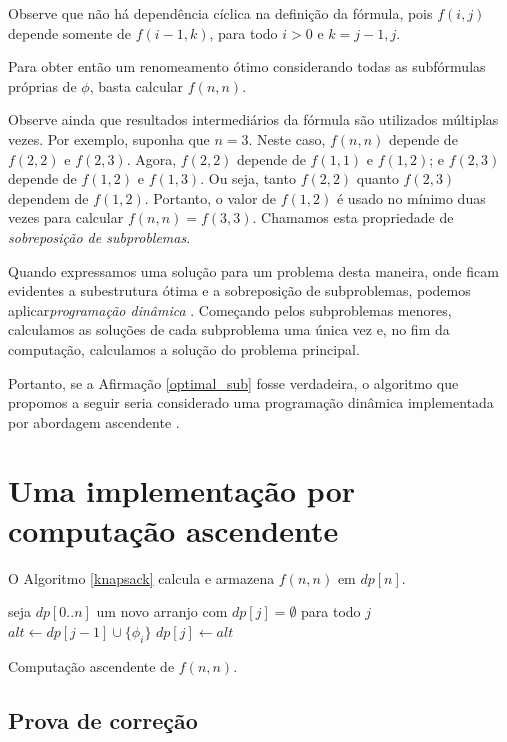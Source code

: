 Observe que não há dependência cíclica na definição da fórmula, pois $f(i,j)$ depende somente de $f(i-1,k)$, para todo $i > 0$ e $k=j-1,j$.

Para obter então um renomeamento ótimo considerando todas as subfórmulas próprias de $\phi$, basta calcular $f(n,n)$.

Observe ainda que resultados intermediários da fórmula são utilizados múltiplas vezes. Por exemplo, suponha que $n = 3$. Neste caso, $f(n,n)$ depende de $f(2,2)$ e $f(2,3)$. Agora, $f(2,2)$ depende de $f(1,1)$ e $f(1,2)$; e $f(2,3)$ depende de $f(1,2)$ e $f(1,3)$. Ou seja, tanto $f(2,2)$ quanto $f(2,3)$ dependem de $f(1,2)$. Portanto, o valor de $f(1,2)$ é usado no mínimo duas vezes para calcular $f(n,n) = f(3,3)$. Chamamos esta propriedade de \emph{sobreposição de subproblemas}.

Quando expressamos uma solução para um problema desta maneira, onde ficam evidentes a subestrutura ótima e a sobreposição de subproblemas, podemos aplicar\break \emph{programação dinâmica} \cite{bellman2015applied}. Começando pelos subproblemas menores, calculamos as soluções de cada subproblema uma única vez e, no fim da computação, calculamos a solução do problema principal.

Portanto, se a Afirmação \ref{optimal_sub} fosse verdadeira, o algoritmo que propomos a seguir seria considerado uma programação dinâmica implementada por abordagem ascendente \cite{bellman2015applied}.

\section{Uma implementação por computação ascendente}

\indent

O Algoritmo \ref{knapsack} calcula e armazena $f(n,n)$ em $dp[n]$.

\begin{algorithm}
	\begin{algorithmic}[1]
		\State seja $dp[0..n]$ um novo arranjo com $dp[j] = \emptyset$ para todo $j$
				\State $alt \gets dp[j-1] \cup \{\phi_i\}$
					\State $dp[j] \gets alt$
				\EndIf
			\EndFor
		\EndFor
	\end{algorithmic}
	\caption{Computação ascendente de $f(n,n)$.}
	\label{knapsack}
\end{algorithm}

\subsection{Prova de correção}

